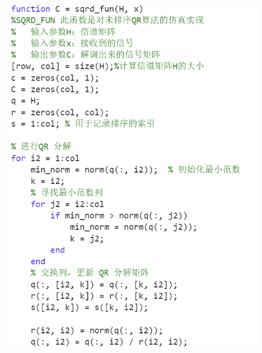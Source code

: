 \documentclass[a4paper,12pt]{article}
\begin{document}
	\begin{figure}
		\centering
		\begin{minipage}{0.4\textwidth}
			\centering
			\includegraphics[width=\textwidth]{6.png}
		\end{minipage}
		\qquad
		\begin{minipage}{0.4\textwidth}
			\centering

\end{minipage}
\end{figure}
\end{document}

